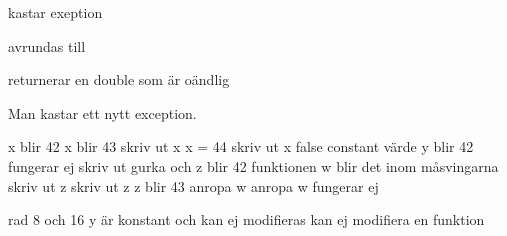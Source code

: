 \Subtask kastar exeption

\Subtask {}

\Subtask avrundas till 

\Subtask {}

\Subtask returnerar en double som är oändlig

\Subtask {}

\Subtask {}

\Subtask {}

\Subtask Man kastar ett nytt exception.

\Task %
\Subtask {}

\Subtask {}

\Subtask {}

\Subtask {}

\Subtask {}

\Subtask {}

\Subtask {}

\Subtask {}

\Subtask {}

\Subtask {}

\Subtask {}

\Subtask {}

\Subtask {}

\Subtask {}

\Subtask {}

\Subtask {}

\Subtask {}

\Subtask {}

\Subtask {}

\Subtask {}

\Subtask {}

\Subtask {}

\Task %

\Task %

\Subtask 
x blir 42
x blir 43
skriv ut x
x = 44
skriv ut x
false
constant värde y blir 42
fungerar ej
skriv ut gurka och z blir 42
funktionen w blir det inom måsvingarna
skriv ut z
skriv ut z
z blir 43
anropa w
anropa w
fungerar ej

\Subtask 

rad 8 och 16 
y är konstant och kan ej modifieras
kan ej modifiera en funktion

